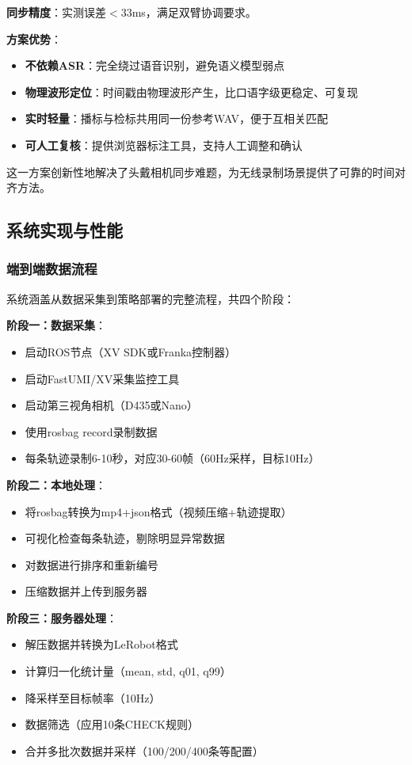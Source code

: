\textbf{同步精度}：实测误差$<$33ms，满足双臂协调要求。

\textbf{方案优势}：
\begin{itemize}[leftmargin=2em]
    \item \textbf{不依赖ASR}：完全绕过语音识别，避免语义模型弱点
    \item \textbf{物理波形定位}：时间戳由物理波形产生，比口语字级更稳定、可复现
    \item \textbf{实时轻量}：播标与检标共用同一份参考WAV，便于互相关匹配
    \item \textbf{可人工复核}：提供浏览器标注工具，支持人工调整和确认
\end{itemize}

这一方案创新性地解决了头戴相机同步难题，为无线录制场景提供了可靠的时间对齐方法。

\subsection{系统实现与性能}

\subsubsection{端到端数据流程}

系统涵盖从数据采集到策略部署的完整流程，共四个阶段：

\textbf{阶段一：数据采集}：
\begin{itemize}[leftmargin=2em]
    \item 启动ROS节点（XV SDK或Franka控制器）
    \item 启动FastUMI/XV采集监控工具
    \item 启动第三视角相机（D435或Nano）
    \item 使用rosbag record录制数据
    \item 每条轨迹录制6-10秒，对应30-60帧（60Hz采样，目标10Hz）
\end{itemize}

\textbf{阶段二：本地处理}：
\begin{itemize}[leftmargin=2em]
    \item 将rosbag转换为mp4+json格式（视频压缩+轨迹提取）
    \item 可视化检查每条轨迹，剔除明显异常数据
    \item 对数据进行排序和重新编号
    \item 压缩数据并上传到服务器
\end{itemize}

\textbf{阶段三：服务器处理}：
\begin{itemize}[leftmargin=2em]
    \item 解压数据并转换为LeRobot格式
    \item 计算归一化统计量（mean, std, q01, q99）
    \item 降采样至目标帧率（10Hz）
    \item 数据筛选（应用10条CHECK规则）
    \item 合并多批次数据并采样（100/200/400条等配置）
\end{itemize}

